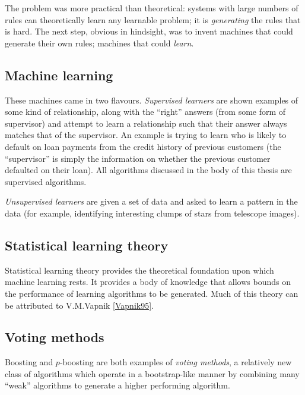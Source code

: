 The problem was more practical than theoretical: systems with large
numbers of rules can theoretically learn any learnable problem; it is
\emph{generating} the rules that is hard.  The next step, obvious in
hindsight, was to invent machines that could generate their own
rules; machines that could \emph{learn}.

\subsection{Machine learning}

These machines came in two flavours.  \emph{Supervised learners} are
shown examples of some kind of relationship, along with the ``right''
answers (from some form of supervisor) and attempt to learn a
relationship such that their answer always matches that of the
supervisor.  An example is trying to learn who is likely to default on
loan payments from the credit history of previous customers (the
``supervisor'' is simply the information on whether the previous
customer defaulted on their loan).  All algorithms discussed in the
body of this thesis are supervised algorithms.

\emph{Unsupervised learners} are given a set of data and asked to
learn a pattern in the data (for example, identifying interesting
clumps of stars from telescope images).

\subsection{Statistical learning theory}

Statistical learning theory provides the theoretical foundation upon
which machine learning rests.  It provides a body of knowledge that
allows bounds on the performance of learning algorithms to be
generated.  Much of this theory can be attributed to V.M.Vapnik
\ref{Vapnik95}.

\subsection{Voting methods}

Boosting and $p$-boosting are both examples of \emph{voting methods},
a relatively new class of algorithms which operate in a bootstrap-like
manner by combining many ``weak'' algorithms to generate a higher
performing algorithm.
